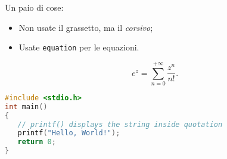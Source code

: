 

Un paio di cose:
\begin{itemize}
\item Non usate il grassetto, ma il \emph{corsivo};
\item Usate \texttt{equation} per le equazioni.
\end{itemize}
\begin{equation}
e^{z}=\sum_{n=0}^{+\infty} \frac{z^n}{n!}.
\end{equation}

\lipsum[3]

\begin{lstlisting}[language=C]
#include <stdio.h>
int main()
{
   // printf() displays the string inside quotation
   printf("Hello, World!");
   return 0;
}
\end{lstlisting}